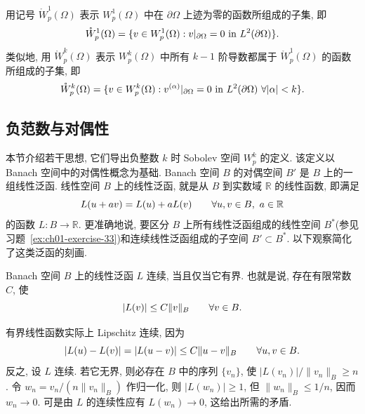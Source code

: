 用记号 $\mathring W_p^1(\Omega)$ 表示 $W_p^1(\Omega)$ 中在 $\partial\Omega$ 上迹为零的函数所组成的子集, 即
\setcounter{equation}{6}
\begin{equation}
\MathBookFormulaID{formula-ch01-zero-trace-w1}
\mathring W_p^1(\Omega)=
\{v\in W_p^1(\Omega):v|_{\partial\Omega}=0\text{ in }L^2(\partial\Omega)\}.
\label{eq:ch01-zero-trace-w1}
\end{equation}
类似地, 用 $\mathring W_p^k(\Omega)$ 表示 $W_p^k(\Omega)$ 中所有 $k-1$ 阶导数都属于 $\mathring W_p^1(\Omega)$ 的函数所组成的子集, 即
\begin{equation}
\MathBookFormulaID{formula-ch01-zero-trace-wk}
\mathring W_p^k(\Omega)=
\{v\in W_p^k(\Omega):v^{(\alpha)}|_{\partial\Omega}=0
\text{ in }L^2(\partial\Omega)\ \forall|\alpha|<k\}.
\label{eq:ch01-zero-trace-wk}
\end{equation}

\subsection{负范数与对偶性}
\label{sec:ch01-negative-norms-duality}

本节介绍若干思想, 它们导出负整数 $k$ 时 Sobolev 空间 $W_p^k$ 的定义. 该定义以 Banach 空间中的对偶性概念为基础. Banach 空间 $B$ 的对偶空间 $B'$ 是 $B$ 上的一组线性泛函. 线性空间 $B$ 上的线性泛函, 就是从 $B$ 到实数域 $\mathbb R$ 的线性函数, 即满足
\[
\MathBookFormulaID{formula-ch01-linear-functional}
L(u+av)=L(u)+aL(v)
\qquad\forall u,v\in B,\ a\in\mathbb R
\]
的函数 $L:B\to\mathbb R$. 更准确地说, 要区分 $B$ 上所有线性泛函组成的线性空间 $B^*$(参见习题~\ref{ex:ch01-exercise-33})和连续线性泛函组成的子空间 $B'\subset B^*$. 以下观察简化了这类泛函的刻画.

\setcounter{thmcount}{0}
\begin{Proposition}
\label{prop:ch01-continuous-iff-bounded}
Banach 空间 $B$ 上的线性泛函 $L$ 连续, 当且仅当它有界. 也就是说, 存在有限常数 $C$, 使
\[
\MathBookFormulaID{formula-ch01-bounded-linear-functional}
|L(v)|\leq C\|v\|_B
\qquad\forall v\in B.
\]
\end{Proposition}

\begin{Proof}
有界线性函数实际上 Lipschitz 连续, 因为
\[
\MathBookFormulaID{formula-ch01-linear-functional-lipschitz}
|L(u)-L(v)|=|L(u-v)|\leq C\|u-v\|_B
\qquad\forall u,v\in B.
\]
反之, 设 $L$ 连续. 若它无界, 则必存在 $B$ 中的序列 $\{v_n\}$, 使 $|L(v_n)|/\|v_n\|_B\geq n$. 令 $w_n=v_n/(n\|v_n\|_B)$ 作归一化, 则 $|L(w_n)|\geq1$, 但 $\|w_n\|_B\leq1/n$, 因而 $w_n\to0$. 可是由 $L$ 的连续性应有 $L(w_n)\to0$, 这给出所需的矛盾.
\end{Proof}

